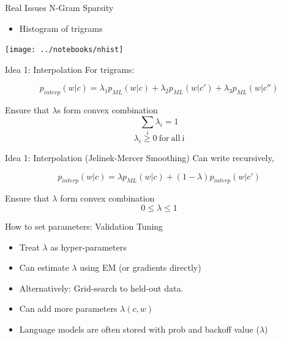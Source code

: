\documentclass{beamer}
\begin{document}
\begin{frame}{Real Issues N-Gram Sparsity}
  \begin{itemize}
  \item Histogram of trigrams 
  \end{itemize}
    \begin{center}
      \texttt{[image: ../notebooks/nhist]}
    \end{center}
\end{frame}


\begin{frame}{Idea 1: Interpolation }
  For trigrams:

  \[ p_{interp}(w |  c) = \lambda_1 p_{ML}(w | c) +  \lambda_2 p_{ML}(w | c') + \lambda_3  p_{ML}(w | c'') \]

  \air

  Ensure that $\lambda$s form convex combination
  \[\sum_i \lambda_i = 1\]
  \[\lambda_i \geq 0 \mathrm{\ for\  all \ i} \]

\end{frame}



\begin{frame}{Idea 1: Interpolation (Jelinek-Mercer Smoothing)}
  Can write recursively,

  \[ p_{interp}(w |  c) =  \lambda p_{ML}(w |  c) + (1 - \lambda) p_{interp}(w | c') \]

  Ensure that $\lambda$ form convex combination
  \[0 \leq \lambda \leq 1\]

  

\end{frame}

\begin{frame}{How to set parameters:  Validation Tuning}
  \begin{itemize}
  \item Treat $\lambda$ as hyper-parameters
    \air 
  \item Can estimate $\lambda$ using EM (or gradients directly) 
    \air
  \item Alternatively: Grid-search to held-out data. 
    \air
  \item Can add more parameters $\lambda(c, w)$  
    
  \item Language models are often stored with prob and backoff value ($\lambda$)
  \end{itemize}
\end{frame}
\end{document}
